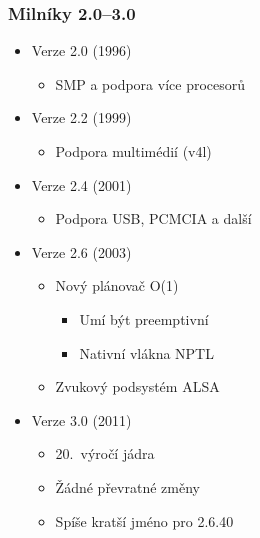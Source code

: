 \documentclass[xcolor=dvipsnames,handout]{beamer}
\begin{document}
\begin{frame}
  \frametitle{Milníky 2.0--3.0}

  \begin{itemize}
    \item Verze 2.0 (1996)
    \begin{itemize}
      \item SMP a podpora více procesorů
    \end{itemize}

    \pause

    \item Verze 2.2 (1999)
    \begin{itemize}
      \item Podpora multimédií (v4l)
    \end{itemize}

    \pause

    \item Verze 2.4 (2001)
    \begin{itemize}
      \item Podpora USB, PCMCIA a další
    \end{itemize}

    \pause

    \item Verze 2.6 (2003)
    \begin{itemize}
      \item Nový plánovač O(1)
      \begin{itemize}
	\item Umí být preemptivní
	\item Nativní vlákna NPTL
      \end{itemize}
      \item Zvukový podsystém ALSA
    \end{itemize}

    \pause

    \item Verze 3.0 (2011)
    \begin{itemize}
      \item 20.\ výročí jádra 
      \item Žádné převratné změny
      \item Spíše kratší jméno pro 2.6.40
    \end{itemize}

  \end{itemize}

\end{frame}
\end{document}
